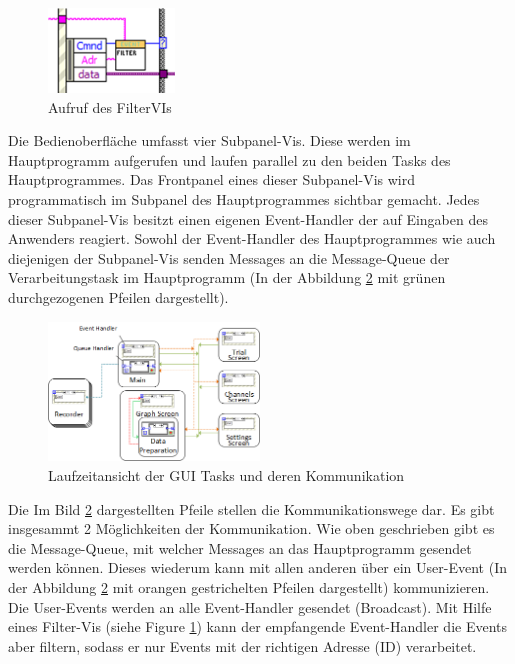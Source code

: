 \documentclass[10pt]{scrartcl}
\begin{document}
\begin{figure}
	\begin{center}
		\includegraphics[width=0.3\textwidth]{filterVI}
		\caption{Aufruf des FilterVIs}
		\label{fig:filterVI}
	\end{center}
\end{figure}
Die Bedienoberfläche umfasst vier Subpanel-Vis. Diese werden im Hauptprogramm aufgerufen und laufen parallel zu den beiden Tasks des Hauptprogrammes. Das \gls{Frontpanel} eines dieser Subpanel-Vis wird programmatisch im Subpanel des Hauptprogrammes sichtbar gemacht.  
Jedes dieser Subpanel-Vis besitzt einen eigenen Event-Handler der auf Eingaben des Anwenders reagiert. Sowohl der Event-Handler des Hauptprogrammes wie auch diejenigen der Subpanel-Vis senden Messages an die Message-Queue der Verarbeitungstask im Hauptprogramm (In der Abbildung \ref{fig:LaufzeitansichtUDA} mit grünen durchgezogenen Pfeilen dargestellt).





\begin{figure}
	\begin{center}
		\includegraphics[width=0.5\textwidth]{LaufzeitansichtMitRecorder}
		\caption{Laufzeitansicht der GUI Tasks und deren Kommunikation}
		\label{fig:LaufzeitansichtUDA}
	\end{center}
\end{figure}
Die Im Bild \ref{fig:LaufzeitansichtUDA} dargestellten Pfeile stellen die Kommunikationswege dar. Es gibt insgesammt 2 Möglichkeiten der Kommunikation. Wie oben geschrieben gibt es die Message-Queue, mit welcher Messages an das Hauptprogramm gesendet werden können. Dieses wiederum kann mit allen anderen über ein User-Event (In der Abbildung \ref{fig:LaufzeitansichtUDA} mit orangen gestrichelten Pfeilen dargestellt) kommunizieren. Die User-Events werden an alle Event-Handler gesendet (Broadcast). Mit Hilfe eines Filter-Vis (siehe Figure \ref{fig:filterVI}) kann der empfangende Event-Handler die Events aber filtern, sodass er nur Events mit der richtigen Adresse (ID) verarbeitet.   
\end{document}
